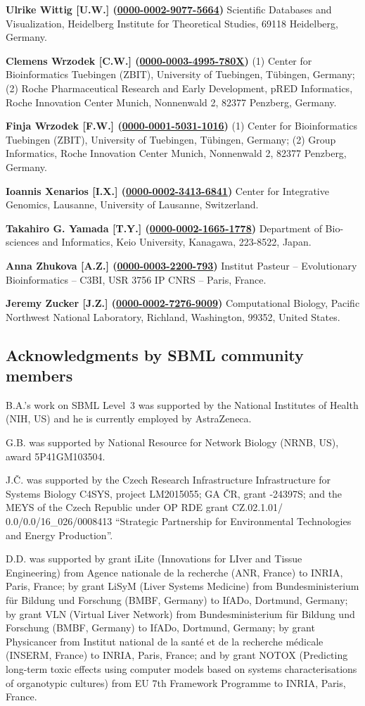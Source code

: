 \documentclass{sbml-paper}
\newcommand{\orcid}[1]{\href{https://orcid.org/#1}{#1}}
\begin{document}
\textbf{Ulrike Wittig [U.W.] (\orcid{0000-0002-9077-5664})} Scientific Databases and Visualization, Heidelberg Institute for Theoretical Studies, 69118 Heidelberg, Germany.

\textbf{Clemens Wrzodek [C.W.] (\orcid{0000-0003-4995-780X})} (1) Center for Bioinformatics Tuebingen (ZBIT), University of Tuebingen, Tübingen, Germany; (2) Roche Pharmaceutical Research and Early Development, pRED Informatics, Roche Innovation Center Munich, Nonnenwald 2, 82377 Penzberg, Germany.

\textbf{Finja Wrzodek [F.W.] (\orcid{0000-0001-5031-1016})} (1) Center for Bioinformatics Tuebingen (ZBIT), University of Tuebingen, Tübingen, Germany; (2) Group Informatics, Roche Innovation Center Munich, Nonnenwald 2, 82377 Penzberg, Germany.

\textbf{Ioannis Xenarios [I.X.] (\orcid{0000-0002-3413-6841})} Center for Integrative Genomics, Lausanne, University of Lausanne, Switzerland.

\textbf{Takahiro G. Yamada [T.Y.] (\orcid{0000-0002-1665-1778})} Department of Bio-sciences and Informatics, Keio University, Kanagawa, 223-8522, Japan.

\textbf{Anna Zhukova [A.Z.] (\orcid{0000-0003-2200-793})} Institut Pasteur – Evolutionary Bioinformatics – C3BI, USR 3756 IP CNRS – Paris, France.

\textbf{Jeremy Zucker [J.Z.] (\orcid{0000-0002-7276-9009})} Computational Biology, Pacific Northwest National Laboratory, Richland, Washington, 99352, United States.


\clearpage
\subsection{Acknowledgments by SBML community members}

B.A.'s work on SBML Level~3 was supported by the National Institutes of Health (NIH, US) and he is currently employed by AstraZeneca.

G.B. was supported by National Resource for Network Biology (NRNB, US), award \No 5P41GM103504.

J.Č. was supported by the Czech Research Infrastructure Infrastructure for Systems Biology C4SYS, project \No LM2015055; GA ČR, grant -24397S; and the MEYS of the Czech Republic under OP RDE grant \No CZ.02.1.01/ 0.0/0.0/16\_026/0008413 ``Strategic Partnership for Environmental Technologies and Energy Production''.

D.D. was supported by grant iLite (Innovations for LIver and Tissue Engineering) from Agence nationale de la recherche (ANR, France) to INRIA, Paris, France; by grant LiSyM (Liver Systems Medicine) from Bundesministerium für Bildung und Forschung (BMBF, Germany) to IfADo, Dortmund, Germany; by grant VLN (Virtual Liver Network) from Bundesministerium für Bildung und Forschung (BMBF, Germany) to IfADo, Dortmund, Germany; by grant Physicancer from Institut national de la santé et de la recherche médicale (INSERM, France) to INRIA, Paris, France; and by grant NOTOX (Predicting long-term toxic effects using computer models based on systems characterisations of organotypic cultures) from EU 7th Framework Programme to INRIA, Paris, France.
\end{document}
